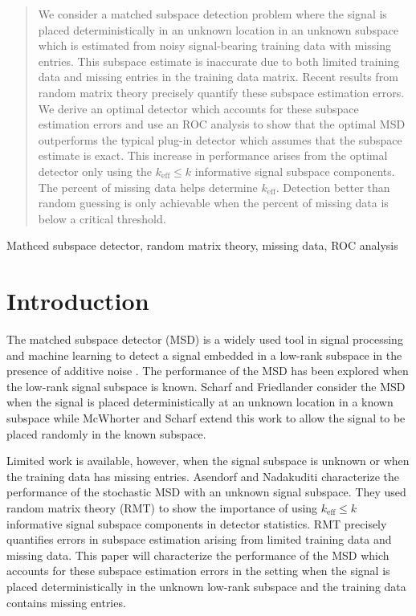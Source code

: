 \begin{abstract}
We consider a matched subspace detection problem where the signal is placed deterministically in an unknown location in an unknown subspace which is estimated from noisy signal-bearing training data with missing entries. This subspace estimate is inaccurate due to both limited training data and missing entries in the training data matrix. Recent results from random matrix theory precisely quantify these subspace estimation errors. We derive an optimal detector which accounts for these  subspace estimation errors and use an ROC analysis to show that the optimal MSD outperforms the typical plug-in detector which assumes that the subspace estimate is exact. This increase in performance arises from the optimal detector only using the $k_\text{eff}\leq k$ informative signal subspace components. The percent of missing data helps determine $k_\text{eff}$. Detection better than random guessing is only achievable when the percent of missing data is below a critical threshold.
\end{abstract}
%
\begin{keywords}
Mathced subspace detector, random matrix theory, missing data, ROC analysis
\end{keywords}
%
\section{Introduction}\label{sec:intro}

The matched subspace detector (MSD) is a widely used tool in signal processing and machine learning to detect a signal embedded in a low-rank subspace in the presence of additive noise \cite{scharf1994matched,jin2005cfar,mcwhorter2003matched}. The performance of the MSD has been explored when the low-rank signal subspace is known. Scharf and Friedlander \cite{scharf1994matched} consider the MSD when the signal is placed deterministically at an unknown location in a known subspace while McWhorter and Scharf \cite{mcwhorter2003matched} extend this work to allow the signal to be placed randomly in the known subspace.

Limited work is available, however, when the signal subspace is unknown or when the training data has missing entries. Asendorf and Nadakuditi \cite{asendorf2011msd} characterize the performance of the stochastic MSD with an unknown signal subspace. They used random matrix theory (RMT) to show the importance of using $k_\text{eff}\leq k$ informative signal subspace components in detector statistics. RMT precisely quantifies errors in subspace estimation arising from limited training data and missing data. This paper will characterize the performance of the MSD which accounts for these subspace estimation errors in the setting when the signal is placed deterministically in the unknown low-rank subspace and the training data contains missing entries.

